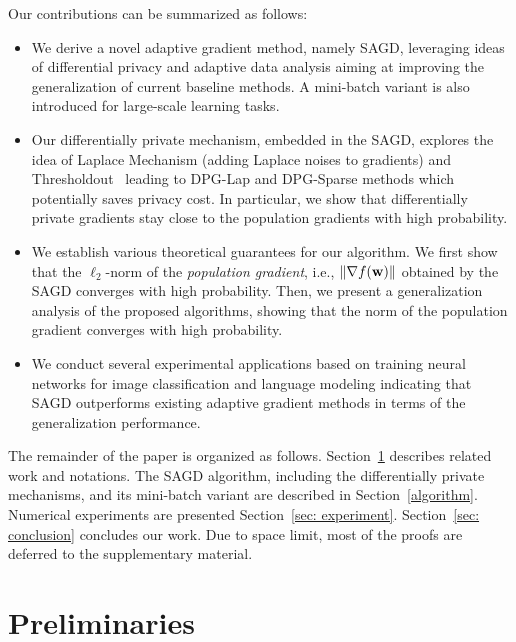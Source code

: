 \documentclass[11pt]{article}
\begin{document}
Our  contributions  can be summarized as follows:
\begin{itemize}
\item We derive a novel adaptive gradient method, namely \textsc{SAGD}, leveraging ideas of differential privacy and adaptive data analysis aiming at improving the generalization of current baseline methods. A mini-batch variant is also introduced for large-scale learning tasks.
\item Our differentially private mechanism, embedded in the \textsc{SAGD}, explores the idea of Laplace Mechanism (adding Laplace noises to gradients) and Thresholdout~\citep{dwro2014} leading to DPG-Lap and DPG-Sparse methods which potentially saves privacy cost. In particular, we show that differentially private gradients stay close to the population gradients with high probability. 
\item We establish various theoretical guarantees for our algorithm. We first show that the $\ell_2$-norm of the \emph{population gradient}, i.e., $\|\nabla f(\mathbf{w})\|$ obtained by the \textsc{SAGD} converges with high probability. Then, we present a generalization analysis of the proposed algorithms, showing that the norm of the population gradient converges with high probability.
\item We conduct several experimental applications based on training neural networks for image classification and language modeling indicating that \textsc{SAGD} outperforms existing adaptive gradient methods in terms of the generalization performance.
\end{itemize}
The remainder of the paper is organized as follows.
Section~\ref{related} describes related work and notations. 
The \textsc{SAGD} algorithm, including the differentially private mechanisms, and its mini-batch variant are described in Section~\ref{algorithm}. 
Numerical experiments are presented Section~\ref{sec: experiment}. 
Section~\ref{sec: conclusion} concludes our work. 
Due to space limit, most of the proofs are deferred to the supplementary material.


\section{Preliminaries}
\label{related}
\end{document}
